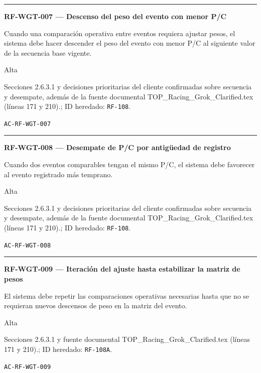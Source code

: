 \documentclass[10pt,letterpaper]{article}
\begin{document}
\vspace{0.25em}\hrule\vspace{0.65em}
\noindent\textbf{RF-WGT-007 --- Descenso del peso del evento con menor P/C}\par
\begin{description}[style=nextline,leftmargin=3.15cm,labelwidth=2.8cm,font=\normalfont\bfseries]
\item[Obligación] Cuando una comparación operativa entre eventos requiera ajustar pesos, el sistema debe hacer descender el peso del evento con menor P/C al siguiente valor de la secuencia base vigente.
\item[Prioridad] Alta
\item[Procedencia] Secciones 2.6.3.1 y decisiones prioritarias del cliente confirmadas sobre secuencia y desempate, además de la fuente documental TOP\_Racing\_Grok\_Clarified.tex (líneas 171 y 210).; ID heredado: \texttt{RF-108}.
\item[Verificación] \texttt{AC-RF-WGT-007}
\end{description}
\vspace{0.25em}\hrule\vspace{0.65em}
\noindent\textbf{RF-WGT-008 --- Desempate de P/C por antigüedad de registro}\par
\begin{description}[style=nextline,leftmargin=3.15cm,labelwidth=2.8cm,font=\normalfont\bfseries]
\item[Obligación] Cuando dos eventos comparables tengan el mismo P/C, el sistema debe favorecer al evento registrado más temprano.
\item[Prioridad] Alta
\item[Procedencia] Secciones 2.6.3.1 y decisiones prioritarias del cliente confirmadas sobre secuencia y desempate, además de la fuente documental TOP\_Racing\_Grok\_Clarified.tex (líneas 171 y 210).; ID heredado: \texttt{RF-108}.
\item[Verificación] \texttt{AC-RF-WGT-008}
\end{description}
\vspace{0.25em}\hrule\vspace{0.65em}
\noindent\textbf{RF-WGT-009 --- Iteración del ajuste hasta estabilizar la matriz de pesos}\par
\begin{description}[style=nextline,leftmargin=3.15cm,labelwidth=2.8cm,font=\normalfont\bfseries]
\item[Obligación] El sistema debe repetir las comparaciones operativas necesarias hasta que no se requieran nuevos descensos de peso en la matriz del evento.
\item[Prioridad] Alta
\item[Procedencia] Secciones 2.6.3.1 y fuente documental TOP\_Racing\_Grok\_Clarified.tex (líneas 171 y 210).; ID heredado: \texttt{RF-108A}.
\item[Verificación] \texttt{AC-RF-WGT-009}
\end{description}
\end{document}
